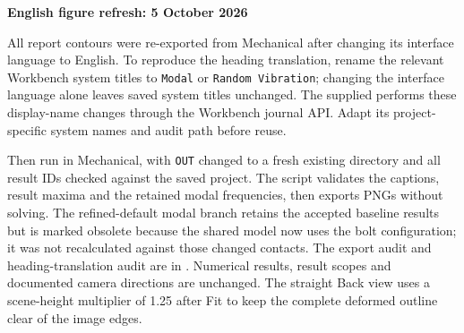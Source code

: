 \documentclass[10pt,a4paper]{article}
\newcommand{\PageTitle}[1]{{\LARGE\bfseries\color{Navy}#1\par}\vspace{7pt}}
\begin{document}
\clearpage
\PageTitle{English figure refresh: 5 October 2026}
All report contours were re-exported from Mechanical after changing its interface language to English. To reproduce the heading translation, rename the relevant Workbench system titles to \texttt{Modal} or \texttt{Random Vibration}; changing the interface language alone leaves saved system titles unchanged. The supplied  performs these display-name changes through the Workbench journal API. Adapt its project-specific system names and audit path before reuse.

Then run  in Mechanical, with \texttt{OUT} changed to a fresh existing directory and all result IDs checked against the saved project. The script validates the captions, result maxima and the retained modal frequencies, then exports PNGs without solving. The refined-default modal branch retains the accepted baseline results but is marked obsolete because the shared model now uses the bolt configuration; it was not recalculated against those changed contacts. The export audit and heading-translation audit are in . Numerical results, result scopes and documented camera directions are unchanged. The straight Back view uses a scene-height multiplier of 1.25 after Fit to keep the complete deformed outline clear of the image edges.
\end{document}
